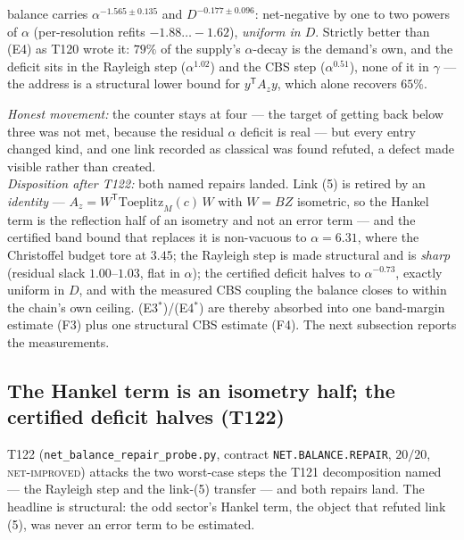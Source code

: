 \documentclass[11pt,a4paper]{article}
\begin{document}
\begin{keybox}
\begin{enumerate}[leftmargin=1.6em]
balance carries $\alpha^{-1.565\pm0.135}$ and $D^{-0.177\pm0.096}$: net-negative by one to two
powers of $\alpha$ (per-resolution refits $-1.88\ldots-1.62$), \emph{uniform in $D$}. Strictly
better than (E4) as T120 wrote it: $79\%$ of the supply's $\alpha$-decay is the demand's own,
and the deficit sits in the Rayleigh step ($\alpha^{1.02}$) and the CBS step ($\alpha^{0.51}$),
none of it in $\gamma$ --- the address is a structural lower bound for
$y^{\mathsf T}A_zy$, which alone recovers $65\%$.
\end{enumerate}
\emph{Honest movement:} the counter stays at four --- the target of getting back below three
was not met, because the residual $\alpha$ deficit is real --- but every entry changed kind,
and one link recorded as classical was found refuted, a defect made visible rather than
created.\\[3pt]
\emph{Disposition after T122:} both named repairs landed. Link (5) is retired by an
\emph{identity} --- $A_z=W^{\mathsf T}\mathrm{Toeplitz}_M(c)\,W$ with $W=BZ$ isometric, so the
Hankel term is the reflection half of an isometry and not an error term --- and the certified
band bound that replaces it is non-vacuous to $\alpha=6.31$, where the Christoffel budget tore
at $3.45$; the Rayleigh step is made structural and is \emph{sharp} (residual slack
$1.00$--$1.03$, flat in $\alpha$); the certified deficit halves to $\alpha^{-0.73}$, exactly
uniform in $D$, and with the measured CBS coupling the balance closes to within the chain's own
ceiling. (E3$^*$)/(E4$^*$) are thereby absorbed into one band-margin estimate (F3) plus one
structural CBS estimate (F4). The next subsection reports the measurements.
\end{keybox}

\subsection{The Hankel term is an isometry half; the certified deficit halves (T122)}
T122 (\texttt{net\_balance\_repair\_probe.py}, contract \texttt{NET.BALANCE.REPAIR}, $20/20$,
\textsc{net-improved}) attacks the two worst-case steps the T121 decomposition named --- the
Rayleigh step and the link-(5) transfer --- and both repairs land. The headline is structural:
the odd sector's Hankel term, the object that refuted link (5), was never an error term to be
estimated.
\end{document}
